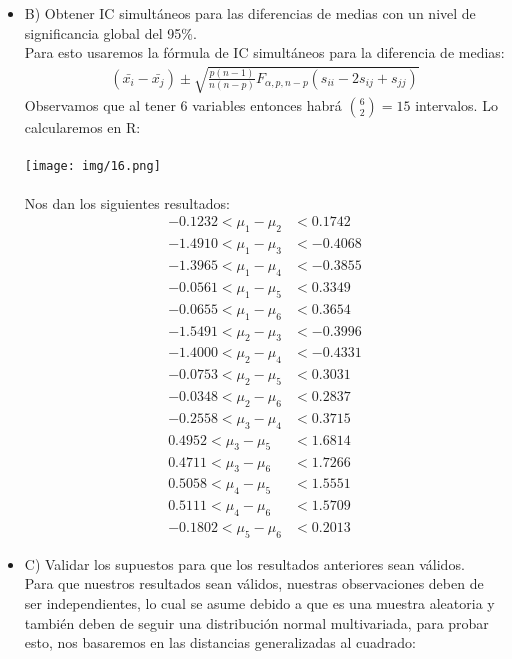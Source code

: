 \begin{sol}
\begin{itemize}
\item B) Obtener IC simultáneos para las diferencias de medias con un nivel de significancia global del 95\%.\\
Para esto usaremos la fórmula de IC simultáneos para la diferencia de medias:
\begin{align*}
(\bar{x_i}-\bar{x_j}) \pm \sqrt{\frac{p(n-1)}{n(n-p)}F_{\alpha,p,n-p}(s_{ii}-2s_{ij}+s_{jj})}
\end{align*}
Observamos que al tener 6 variables entonces habrá $\binom{6}{2} = 15$ intervalos. Lo calcularemos en R:\\\\
\texttt{[image: img/16.png]}\\\\
Nos dan los siguientes resultados:
\begin{align*}
    -0.1232 < \mu_{1} - \mu_{2} &< 0.1742 \\
    -1.4910 < \mu_{1} - \mu_{3} &< -0.4068 \\
    -1.3965 < \mu_{1} - \mu_{4} &< -0.3855 \\
    -0.0561 < \mu_{1} - \mu_{5} &< 0.3349 \\
    -0.0655 < \mu_{1} - \mu_{6} &< 0.3654 \\
    -1.5491 < \mu_{2} - \mu_{3} &< -0.3996 \\
    -1.4000 < \mu_{2} - \mu_{4} &< -0.4331 \\
    -0.0753 < \mu_{2} - \mu_{5} &< 0.3031 \\
    -0.0348 < \mu_{2} - \mu_{6} &< 0.2837 \\
    -0.2558 < \mu_{3} - \mu_{4} &< 0.3715 \\
    0.4952 < \mu_{3} - \mu_{5} &< 1.6814 \\
    0.4711 < \mu_{3} - \mu_{6} &< 1.7266 \\
    0.5058 < \mu_{4} - \mu_{5} &< 1.5551 \\
    0.5111 < \mu_{4} - \mu_{6} &< 1.5709 \\
    -0.1802 < \mu_{5} - \mu_{6} &< 0.2013
\end{align*} \pagebreak
\item C) Validar los supuestos para que los resultados anteriores sean válidos. \\
Para que nuestros resultados sean válidos, nuestras observaciones deben de ser independientes, lo cual se asume debido a que es una muestra aleatoria y también deben de seguir una distribución normal multivariada, para probar esto, nos basaremos en las distancias generalizadas al cuadrado:

\end{itemize}
\end{sol}
